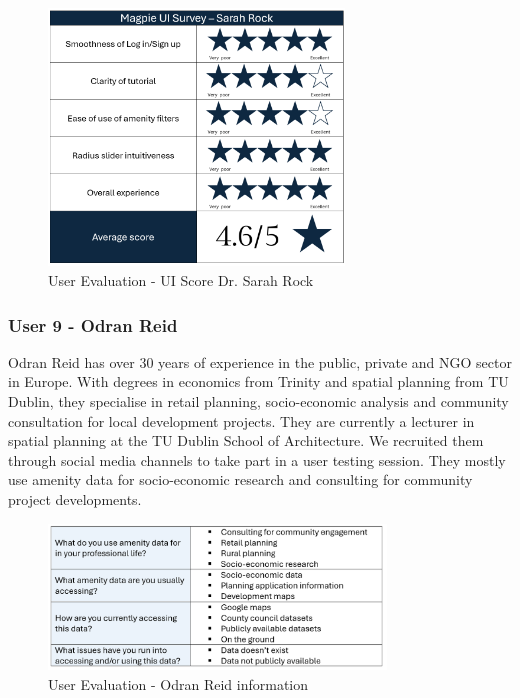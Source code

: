 \begin{figure}[h!]
    \centering
    \includegraphics[width=0.7\textwidth]{images/survey-sarah.png}
    \caption{User Evaluation - UI Score Dr. Sarah Rock}
\end{figure}


\newpage{}

\subsubsection{User 9 - Odran Reid}
Odran Reid has over 30 years of experience in the public,
private and NGO sector in Europe. With degrees in economics from Trinity and
spatial planning from TU Dublin, they specialise in retail planning,
socio-economic analysis and community consultation for local development
projects. They are currently a lecturer in spatial planning at the TU Dublin
School of Architecture. We recruited them through social media channels to take
part in a user testing session. They mostly use amenity data for socio-economic
research and consulting for community project developments.

\begin{figure}[h!]
    \centering
    \includegraphics[width=0.8\textwidth]{images/odran-amenity-info.png}
    \caption{User Evaluation - Odran Reid information}
\end{figure}

